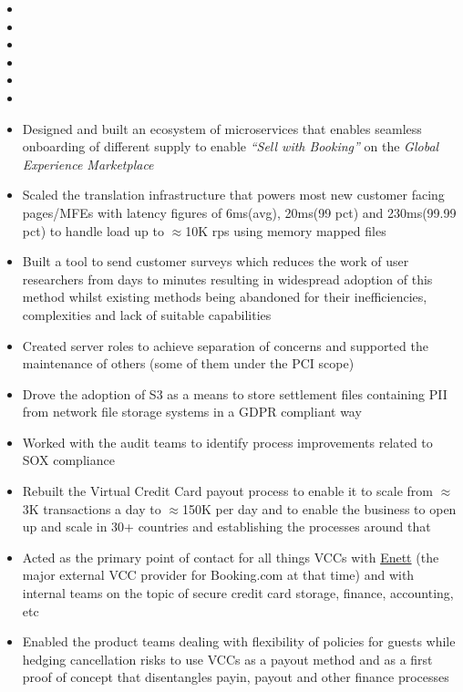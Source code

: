 \documentclass{article}
\begin{document}
\begin{itemize}[noitemsep,nolistsep]
\item <todo: fill in stuff about foundations>
\item <todo: fill in stuff about relevance>
\item <todo: fill in stuff about data>
\item <todo: fill in stuff about distribution>
\item <todo: fill in stuff about transactions>
\item <todo: fill in stuff about promos>
\item Designed and built an ecosystem of microservices that enables seamless onboarding of different supply to enable \textit{“Sell with Booking”} on the \textit{Global Experience Marketplace}
\item Scaled the translation infrastructure that powers most new customer facing pages/MFEs with latency figures of 6ms(avg), 20ms(99 pct) and 230ms(99.99 pct) to handle load up to $\approx$10K rps using memory mapped files
\item Built a tool to send customer surveys which reduces the work of user researchers from days to minutes resulting in widespread adoption of this method whilst existing methods being abandoned for their inefficiencies, complexities and lack of suitable capabilities
\item Created server roles to achieve separation of concerns and supported the maintenance of others (some of them under the PCI scope)
\item Drove the adoption of S3 as a means to store settlement files containing PII from network file storage systems in a GDPR compliant way
\item Worked with the audit teams to identify process improvements related to SOX compliance
\item Rebuilt the Virtual Credit Card payout process to enable it to scale from $\approx$3K transactions a day to $\approx$150K per day and to enable the business to open up and scale in 30+ countries and establishing the processes around that
\item Acted as the primary point of contact for all things VCCs with \href{https://www.enett.com/}{Enett} (the major external VCC provider for Booking.com at that time) and with internal teams on the topic of secure credit card storage, finance, accounting, etc
\item Enabled the product teams dealing with flexibility of policies for guests while hedging cancellation risks to use VCCs as a payout method and as a first proof of concept that disentangles payin, payout and other finance processes

\end{itemize}
\end{document}
